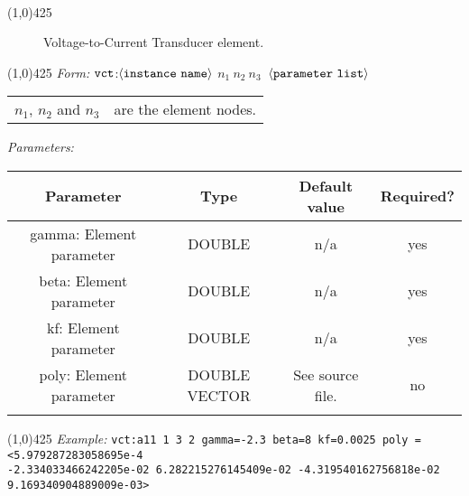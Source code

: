 \documentclass{article}
\begin{document}
\\
\hrulefill\linethickness{0.5mm}\line(1,0){425}
\normalsize
\begin{figure}[h]
\centerline{\epsfxsize=0.6in}
\caption{Voltage-to-Current Transducer element.}
\end{figure}
\newline
\linethickness{0.5mm} \line(1,0){425}
\newline
\textit{Form:}
$\tt vct$:$\langle \tt{instance\ name}\rangle$ $n_1\ n_2\ n_3\ $
$\langle \tt{parameter\ list}\rangle$
\newline
\begin{tabular}{r l}
$n_1$, $n_2$ and $n_3$ & are the element nodes. \\
\end{tabular}
\newline
\textit{Parameters:}
\begin{table}[H]
\begin{tabular}{|c|c|c|c|}
\hline
Parameter&Type&Default value&Required?\\
\hline
gamma: Element parameter & DOUBLE & n/a & yes  \\
\hline
beta: Element parameter & DOUBLE & n/a & yes \\
\hline
kf: Element parameter & DOUBLE & n/a & yes \\
\hline
poly: Element parameter & DOUBLE VECTOR & See source file.
& no\\
\par
\hline
\end{tabular}
\end{table}
\noindent\linethickness{0.5mm}\line(1,0){425}
\newline
\textit{Example:}
\newline
\texttt{vct:a11\ 1\ 3\ 2\ gamma=-2.3 beta=8 kf=0.0025 poly =
<5.979287283058695e-4 \\
-2.334033466242205e-02 6.282215276145409e-02
-4.319540162756818e-02\\
9.169340904889009e-03>}
\end{document}
